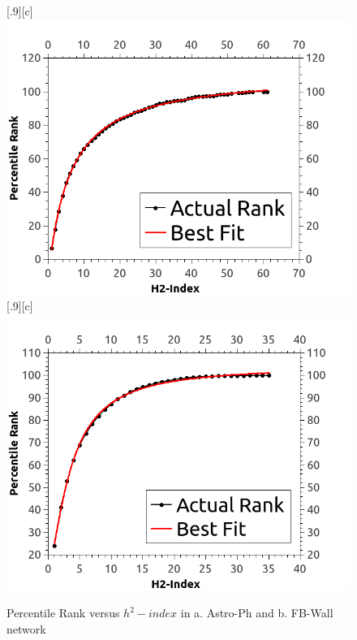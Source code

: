 \documentclass[conference]{IEEEtran}
\begin{document}
\begin{figure}[htp]
  \centering
  [.9\linewidth][c]{%
    \includegraphics[width=.9\linewidth]{images/astroph_qti.png}}\quad
  [.9\linewidth][c]{%
    \includegraphics[width=.9\linewidth]{images/fbwall_qti.png}}
  \caption{Percentile Rank versus $h^2-index$ in a. Astro-Ph and b. FB-Wall network}
  \label{fig1}
\end{figure}

\end{document}
